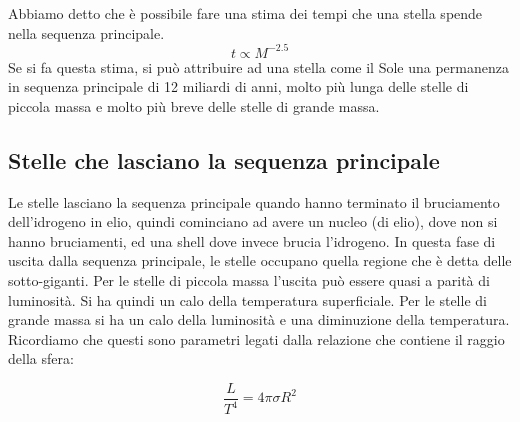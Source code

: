 \documentclass[a4paper,11pt]{article}
\begin{document}
\newpage
Abbiamo detto che è possibile fare una stima dei tempi che una stella spende nella sequenza principale.
$$
    t \propto M ^{-2.5}
$$
Se si fa questa stima, si può attribuire ad una stella come il Sole una permanenza in sequenza principale di 12 miliardi di anni, molto più lunga delle stelle di piccola massa e molto più breve delle stelle di grande massa.\\ 
\subsection{Stelle che lasciano la sequenza principale}
Le stelle lasciano la sequenza principale quando hanno terminato il bruciamento dell'idrogeno in elio, quindi cominciano ad avere un nucleo (di elio), dove non si hanno bruciamenti, ed una shell dove invece brucia l'idrogeno. In questa fase di uscita dalla sequenza principale, le stelle occupano quella regione che è detta delle sotto-giganti. Per le stelle di piccola massa l'uscita può essere quasi a parità di luminosità. Si ha quindi un calo della temperatura superficiale. Per le stelle di grande massa si ha un calo della luminosità e una diminuzione della temperatura. \\ Ricordiamo che questi sono parametri legati dalla relazione che contiene il raggio della sfera:

$$
    \frac{L}{T^{4}} = 4 \pi \sigma R^{2}
$$
\end{document}
